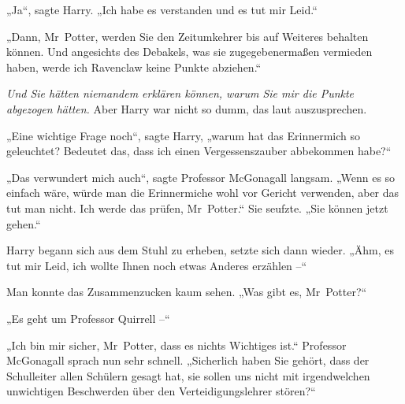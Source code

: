 „Ja“, sagte Harry. „Ich habe es verstanden und es tut mir Leid.“

„Dann, Mr~Potter, werden Sie den Zeitumkehrer bis auf Weiteres behalten können. Und angesichts des Debakels, was sie zugegebenermaßen vermieden haben, werde ich Ravenclaw keine Punkte abziehen.“

\emph{Und Sie hätten niemandem erklären können, warum Sie mir die Punkte abgezogen hätten.} Aber Harry war nicht so dumm, das laut auszusprechen.

„Eine wichtige Frage noch“, sagte Harry, „warum hat das Erinnermich so geleuchtet? Bedeutet das, dass ich einen Vergessenszauber abbekommen habe?“

„Das verwundert mich auch“, sagte Professor McGonagall langsam. „Wenn es so einfach wäre, würde man die Erinnermiche wohl vor Gericht verwenden, aber das tut man nicht. Ich werde das prüfen, Mr~Potter.“ Sie seufzte. „Sie können jetzt gehen.“

Harry begann sich aus dem Stuhl zu erheben, setzte sich dann wieder. „Ähm, es tut mir Leid, ich wollte Ihnen noch etwas Anderes erzählen –“

Man konnte das Zusammenzucken kaum sehen. „Was gibt es, Mr~Potter?“

„Es geht um Professor Quirrell –“

„Ich bin mir sicher, Mr~Potter, dass es nichts Wichtiges ist.“ Professor McGonagall sprach nun sehr schnell. „Sicherlich haben Sie gehört, dass der Schulleiter allen Schülern gesagt hat, sie sollen uns nicht mit irgendwelchen unwichtigen Beschwerden über den Verteidigungslehrer stören?“

